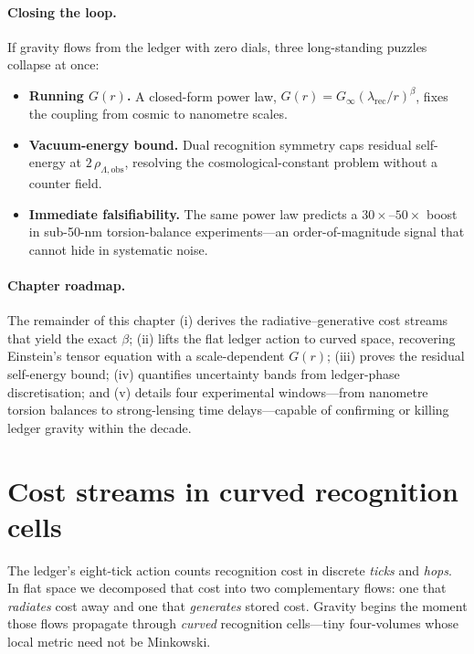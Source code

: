 \documentclass[11pt,oneside]{book}
\begin{document}
{\paragraph{Closing the loop.}
If gravity flows from the ledger with zero dials, three long-standing
puzzles collapse at once:

\begin{itemize}
   \item \textbf{Running \(G(r)\).}  A closed-form power law,
         \(G(r)=G_{\infty}(\lambda_{\text{rec}}/r)^{\beta}\), fixes the
         coupling from cosmic to nanometre scales.
   \item \textbf{Vacuum-energy bound.}  Dual recognition symmetry caps
         residual self-energy at \(2\,\rho_{\Lambda,\mathrm{obs}}\),
         resolving the cosmological-constant problem without a counter
         field.
   \item \textbf{Immediate falsifiability.}  The same power law predicts
         a \(30\!\times\)–\(50\!\times\) boost in sub-50-nm
         torsion-balance experiments—an order-of-magnitude signal that
         cannot hide in systematic noise.
\end{itemize}

\paragraph{Chapter roadmap.}
The remainder of this chapter (i) derives the radiative–generative cost
streams that yield the exact \(\beta\); (ii) lifts the flat ledger
action to curved space, recovering Einstein’s tensor equation with a
scale-dependent \(G(r)\); (iii) proves the residual self-energy bound;
(iv) quantifies uncertainty bands from ledger-phase discretisation; and
(v) details four experimental windows—from nanometre torsion balances to
strong-lensing time delays—capable of confirming or killing ledger
gravity within the decade.


\section{Cost streams in curved recognition cells}

The ledger’s eight-tick action counts recognition cost in discrete
\emph{ticks} and \emph{hops}.  
In flat space we decomposed that cost into two complementary flows:
one that \emph{radiates} cost away and one that \emph{generates} stored
cost.  
Gravity begins the moment those flows propagate through \emph{curved}
recognition cells—tiny four-volumes whose local metric need not be
Minkowski.

}
\end{document}
